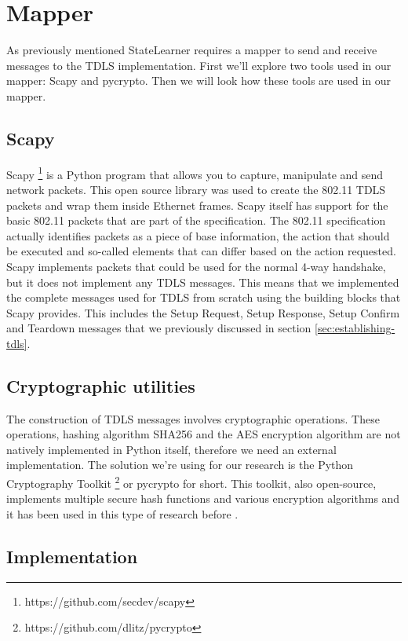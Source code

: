 \section{Mapper}

As previously mentioned StateLearner requires a mapper to send and receive messages to the TDLS implementation. First we'll explore two tools used in our mapper: Scapy and pycrypto. Then we will look how these tools are used in our mapper.

\subsection{Scapy}

Scapy \footnote{https://github.com/secdev/scapy} is a Python program that allows you to capture, manipulate and send network packets. This open source library was used to create the 802.11 TDLS packets and wrap them inside Ethernet frames. Scapy itself has support for the basic 802.11 packets that are part of the specification. The 802.11 specification actually identifies packets as a piece of base information, the action that should be executed and so-called elements that can differ based on the action requested. Scapy implements packets that could be used for the normal 4-way handshake, but it does not implement any TDLS messages.
This means that we implemented the complete messages used for TDLS from scratch using the building blocks that Scapy provides. This includes the Setup Request, Setup Response, Setup Confirm and Teardown messages that we previously discussed in section \ref{sec:establishing-tdls}.

\subsection{Cryptographic utilities}

The construction of TDLS messages involves cryptographic operations. These operations, hashing algorithm SHA256 and the AES encryption algorithm are not natively implemented in Python itself, therefore we need an external implementation. The solution we're using for our research is the Python Cryptography Toolkit \footnote{https://github.com/dlitz/pycrypto} or pycrypto for short. This toolkit, also open-source, implements multiple secure hash functions and various encryption algorithms and it has been used in this type of research before \cite{Vanhoef:2017,Veldhuizen:2017}.

\subsection{Implementation}

